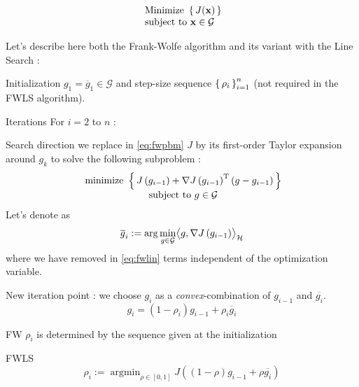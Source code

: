\begin{boxproblem}
  \begin{equation} \label{eq:fwpbm}
    \begin{array} { l } { \text { Minimize } \left \{ \, J ( \mathbf { x } ) \, \right \} } \\ { \text { subject to } \mathbf { x } \in \mathcal{G} } \end{array}
  \end{equation}
\end{boxproblem}
Let's describe here both the Frank-Wolfe algorithm and its variant with the Line Search :
\begin{boxprogramming}
\begin{mydescription}
  \item [Initialization] $g _ { 1 } = \overline { g } _ { 1 } \in \mathcal { G }$ and
  step-size sequence $\left \{ \, \rho_i \, \right \}_{i=1}^n$ (not required in the FWLS algorithm).
  \item [Iterations] For $i=2$ to $n$ :
  \begin{mydescription}[0.2cm]
    \item [Search direction] we replace in \eqref{eq:fwpbm} $J$ by its first-order
    Taylor expansion around $g_k$ to solve the following subproblem :
      \begin{equation}\label{eq:fwlin}
        \begin{array} { c } { \text { minimize }  \left \{ \, J \left( g_{i-1} \right) + \nabla J \left( g_{i-1} \right) ^ { \mathrm { T } } \left( g - g_{i-1} \right) \, \right \} } \\ { \text { subject to } g \in \mathcal{G} } \end{array}
      \end{equation}
Let's denote as \cite{FWBQ}
\begin{equation}\label{eq:gbar}
  \overline { g } _ { i } := \arg \min _ { g \in \mathcal{G} } \bigl \langle g ,  \nabla J \left( g _ { i - 1 } \right) \bigr \rangle_{\mathcal{H}}
\end{equation}
 where we have removed
 in \eqref{eq:fwlin} terms independent of the optimization variable.
 \item [New iteration point]: we choose $g_i$ as a \textit{convex}-combination of
 $g_{i-1}$ and $\overline{g_i}$.
 \begin{equation}
   \label{eq:12}
   g _ { i } = \left( 1 - \rho _ { i } \right) g _ { i - 1 } + \rho _ { i } \overline{ g } _ { i }
 \end{equation}
 \begin{mydescription}
\item [FW] $\rho _ { i }$ is  determined by the sequence given at the initialization
\item [FWLS]
\begin{equation*}
\rho _ { i } := \operatorname { argmin } _ { \rho \in [ 0,1 ] } J \left( ( 1 - \rho ) g _ { i - 1 } + \rho \overline{g _ { i }} \right)
\end{equation*}

 \end{mydescription}
  \end{mydescription}
\end{mydescription}
\end{boxprogramming}

